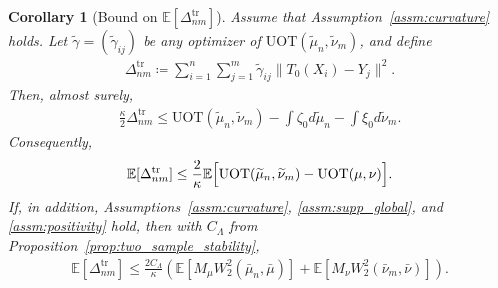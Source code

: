 \documentclass[11pt,reqno]{amsart}
\newtheorem{corollary}[theorem]{Corollary}
\theoremstyle{definition}
\renewcommand{\tilde}{\widetilde}
\newcommand{\Ep}{\mathbb{E}}
\begin{document}
\begin{corollary}[{Bound on $\Ep[\Delta_{nm}^{\mathrm{tr}}]$}]
\label{cor:uot_prop13_one_sided}
Assume that Assumption~\ref{assm:curvature} holds.
Let $\tilde\gamma=(\tilde\gamma_{ij})$ be any optimizer of $\mathrm{UOT}(\tilde\mu_n,\tilde\nu_m)$, and define
\begin{align}
    \Delta_{nm}^{\mathrm{tr}}
    \coloneqq
    \sum_{i=1}^n\sum_{j=1}^m
    \tilde\gamma_{ij}
    \|T_0(X_i)-Y_j\|^2.
\end{align}
Then, almost surely,
\begin{align}
\label{eq:uot_prop13_one_sided_as}
    \frac{\kappa}{2}\Delta_{nm}^{\mathrm{tr}}
    \le
    \mathrm{UOT}(\tilde\mu_n,\tilde\nu_m)
    - \int \zeta_0   d\tilde\mu_n
    - \int \xi_0   d\tilde\nu_m.
\end{align}
Consequently,
\begin{align}
\label{eq:uot_prop13_one_sided_expectation}
    \Ep[\Delta_{nm}^{\mathrm{tr}}]
    \le
    \frac{2}{\kappa}
    \Ep\Bigl[
        \mathrm{UOT}(\tilde\mu_n,\tilde\nu_m) - \mathrm{UOT}(\mu,\nu)
    \Bigr].
\end{align}
If, in addition, Assumptions~\ref{assm:curvature}, \ref{assm:supp_global}, and \ref{assm:positivity} hold, then with $C_\Lambda$ from Proposition~\ref{prop:two_sample_stability},
\begin{align}
\label{eq:uot_prop13_one_sided_rate}
    \Ep[\Delta_{nm}^{\mathrm{tr}}]
    \le
    \frac{2C_\Lambda}{\kappa}
    \left(
        \Ep[M_\mu W_2^2(\bar\mu_n,\bar\mu)] + \Ep[M_\nu W_2^2(\bar\nu_m,\bar\nu)]
    \right).
\end{align}
\end{corollary}
\end{document}
